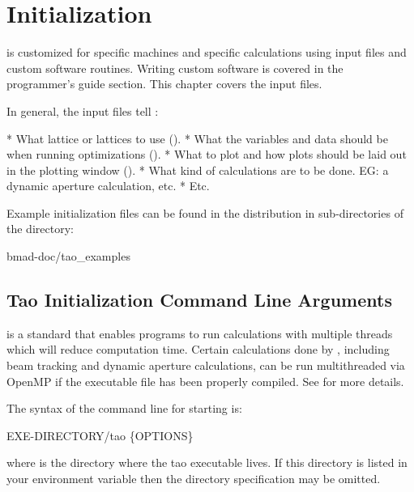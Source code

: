 \chapter{Initialization}
\label{c:init}

\tao is customized for specific machines and specific calculations using input files and custom
software routines. Writing custom software is covered in the programmer's guide section. This
chapter covers the input files.

In general, the input files tell \tao:
\begin{example}
  * What \bmad lattice or lattices to use ().
  * What the variables and data should be when running optimizations ().
  * What to plot and how plots should be laid out in the plotting window ().
  * What kind of calculations are to be done. EG: a dynamic aperture calculation, etc.
  * Etc.
\end{example}

Example initialization files can be found in the \tao distribution in sub-directories of the
directory:
\begin{example}
  bmad-doc/tao_examples
\end{example}

\section{Tao Initialization Command Line Arguments}
\label{s:command.line} 

 is a standard that enables programs to run calculations with multiple threads which will
reduce computation time. Certain calculations done by \tao, including beam tracking and dynamic
aperture calculations, can be run multithreaded via OpenMP if the \tao executable file has been
properly compiled. See  for more details.

The syntax of the command line for starting \tao is:
\begin{example}
  EXE-DIRECTORY/tao \{OPTIONS\}
\end{example}
where  is the directory where the tao executable lives. If this directory is
listed in your  environment variable then the directory specification may be omitted.

